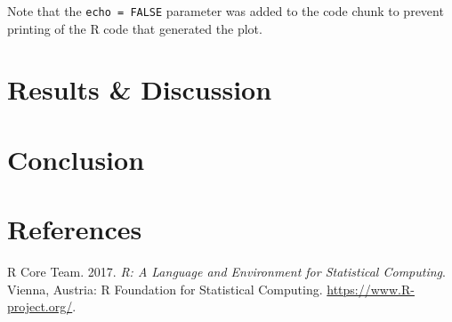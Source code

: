 \documentclass[]{article}
\begin{document}
Note that the \texttt{echo\ =\ FALSE} parameter was added to the code
chunk to prevent printing of the R code that generated the plot.

\section{Results \& Discussion}\label{results-discussion}

\section{Conclusion}\label{conclusion}

\section*{References}\label{references}

\hypertarget{refs}{}
\hypertarget{ref-RCoreTeam}{}
R Core Team. 2017. \emph{R: A Language and Environment for Statistical
Computing}. Vienna, Austria: R Foundation for Statistical Computing.
\url{https://www.R-project.org/}.
\end{document}
